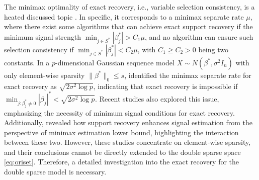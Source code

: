 \documentclass[12pt]{article}
\begin{document}

The minimax optimality of exact recovery, i.e., variable selection consistency, is a heated discussed topic \cite{WJM07rec, WW10it, butucea17, CM18, butucea23group}. 
In specific, it corresponds to a minimax separate rate $\mu$, where there exist some algorithms that can achieve exact support recovery if the minimum signal strength $ \min_{j \in S^*} |\beta^*_j| > C_1 \mu$, and no algorithm can ensure such selection consistency if $ \min_{j \in S^*} |\beta^*_j| < C_2\mu$, with $C_1 \geq C_2 > 0$ being two constants. In a $p$-dimensional Gaussian sequence model $X \sim N(\beta^*, \sigma^2 I_n)$ with only element-wise sparsity $\|\beta^*\|_0 \leq s$, \cite{CM18} identified the minimax separate rate for exact recovery as $\sqrt{2 \sigma^2 \log p}$, indicating that exact recovery is impossible if $ \min_{j: \beta^*_j \neq 0} |\beta_j|^* < \sqrt{2 \sigma^2 \log p}$.
Recent studies \citep{Zhengstoev20, Belitser22UQ, castillo24sharp} also explored this issue, emphasizing the necessity of minimum signal conditions for exact recovery. Additionally, \cite{MN19} revealed how support recovery enhances signal estimation from the perspective of minimax estimation lower bound, highlighting the interaction between these two.
However, these studies concentrate on element-wise sparsity, and their conclusions cannot be directly extended to the double sparse space \eqref{eq:oriset}. 
Therefore, a detailed investigation into the exact recovery for the double sparse model is necessary.

\end{document}
